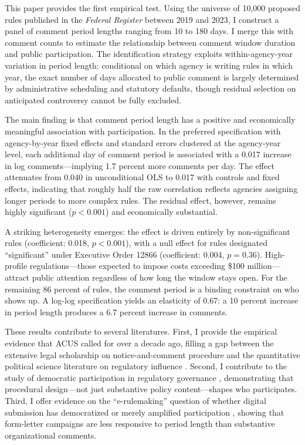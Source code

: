 \documentclass[12pt]{article}
\begin{document}
This paper provides the first empirical test. Using the universe of 10,000 proposed rules published in the \textit{Federal Register} between 2019 and 2023, I construct a panel of comment period lengths ranging from 10 to 180 days. I merge this with comment counts to estimate the relationship between comment window duration and public participation. The identification strategy exploits within-agency-year variation in period length: conditional on which agency is writing rules in which year, the exact number of days allocated to public comment is largely determined by administrative scheduling and statutory defaults, though residual selection on anticipated controversy cannot be fully excluded.

The main finding is that comment period length has a positive and economically meaningful association with participation. In the preferred specification with agency-by-year fixed effects and standard errors clustered at the agency-year level, each additional day of comment period is associated with a 0.017 increase in log comments---implying 1.7 percent more comments per day. The effect attenuates from 0.040 in unconditional OLS to 0.017 with controls and fixed effects, indicating that roughly half the raw correlation reflects agencies assigning longer periods to more complex rules. The residual effect, however, remains highly significant ($p < 0.001$) and economically substantial.

A striking heterogeneity emerges: the effect is driven entirely by non-significant rules (coefficient: 0.018, $p < 0.001$), with a null effect for rules designated ``significant'' under Executive Order 12866 (coefficient: 0.004, $p = 0.36$). High-profile regulations---those expected to impose costs exceeding \$100 million---attract public attention regardless of how long the window stays open. For the remaining 86 percent of rules, the comment period is a binding constraint on who shows up. A log-log specification yields an elasticity of 0.67: a 10 percent increase in period length produces a 6.7 percent increase in comments.

These results contribute to several literatures. First, I provide the empirical evidence that ACUS called for over a decade ago, filling a gap between the extensive legal scholarship on notice-and-comment procedure \citep{kerwin2019rulemaking, shapiro2016regulatory} and the quantitative political science literature on regulatory influence \citep{yackee2006sweet, yackee2006assessing, gordon2020watching}. Second, I contribute to the study of democratic participation in regulatory governance \citep{coglianese2004eRulemaking, farina2012rulemaking, mendelson2011rulemaking}, demonstrating that procedural design---not just substantive policy content---shapes who participates. Third, I offer evidence on the ``e-rulemaking'' question of whether digital submission has democratized or merely amplified participation \citep{balla2021mass, livermore2014regulatory}, showing that form-letter campaigns are less responsive to period length than substantive organizational comments.
\end{document}

